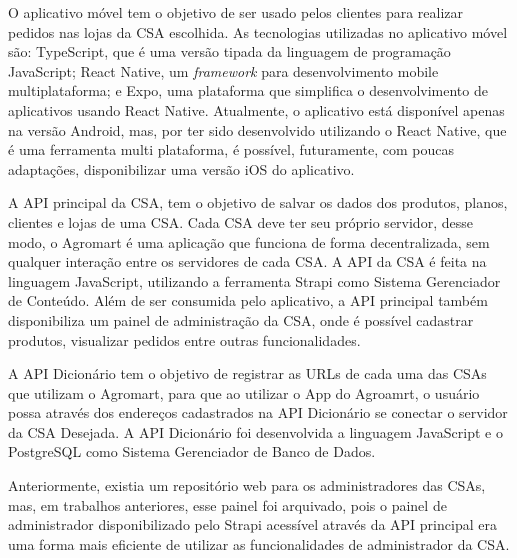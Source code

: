 O aplicativo móvel tem o objetivo de ser usado pelos clientes para realizar pedidos nas lojas da CSA escolhida. As tecnologias utilizadas no aplicativo móvel são: TypeScript, que é uma versão tipada da linguagem de programação JavaScript; React Native, um \textit{framework} para desenvolvimento mobile multiplataforma; e Expo, uma plataforma que simplifica o desenvolvimento de aplicativos usando React Native. Atualmente, o aplicativo está disponível apenas na versão Android, mas, por ter sido desenvolvido utilizando o React Native, que é uma ferramenta multi plataforma, é possível, futuramente, com poucas adaptações, disponibilizar uma versão iOS do aplicativo.

A API principal da CSA, tem o objetivo de salvar os dados dos produtos, planos, clientes e lojas de uma CSA. Cada CSA deve ter seu próprio servidor, desse modo, o Agromart é uma aplicação que funciona de forma decentralizada, sem qualquer interação entre os servidores de cada CSA. A API da CSA é feita na linguagem JavaScript, utilizando a ferramenta Strapi como Sistema Gerenciador de Conteúdo.
Além de ser consumida pelo aplicativo, a API principal também disponibiliza um painel de administração da CSA, onde é possível cadastrar produtos, visualizar pedidos entre outras funcionalidades.

A API Dicionário tem o objetivo de registrar as URLs de cada uma das CSAs que utilizam o Agromart, para que ao utilizar o App do Agroamrt, o usuário possa através dos endereços cadastrados na API Dicionário se conectar o servidor da CSA Desejada. A API Dicionário foi desenvolvida a linguagem JavaScript e o PostgreSQL como Sistema Gerenciador de Banco de Dados.

Anteriormente, existia um repositório web para os administradores das CSAs, mas, em trabalhos anteriores, esse painel foi arquivado, pois o painel de administrador disponibilizado pelo Strapi acessível através da API principal era uma forma mais eficiente de utilizar as funcionalidades de administrador da CSA.

